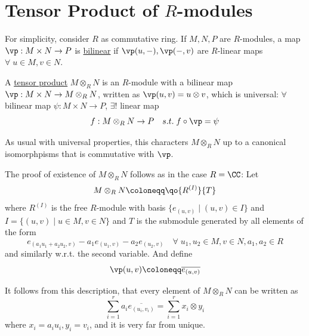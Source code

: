 \section{Tensor Product of \( R \)-modules}
For simplicity, consider \( R \) as commutative ring. If \( M,N,P \) are \( R \)-modules, a map \(
\vp: M\times N \to P \) is \underline{bilinear} if \( \vp(u,-), \vp(-,v) \) are \( R \)-linear maps
\( \forall \; u \in M, v\in N \).

\begin{definition}
	A \underline{tensor product} \( M \otimes_R N \) is an \( R \)-module with a bilinear map \( \vp:
	M \times N \to M \otimes_R N\), written as \( \vp(u,v) = u\otimes v \), which is universal: \(
	\forall  \) bilinear map \( \psi : M\times N \to P \), \( \exists ! \) linear map
	\[
		f: M \otimes_R N \to P \quad s.t. \; f\circ \vp = \psi
	\]
\end{definition}

\begin{remark}
	As usual with universal properties, this characters \( M \otimes_R N \) up to a canonical
	isomorphpisms that is commutative with \( \vp \).
\end{remark}

\begin{remark}
	The proof of existence of \( M \otimes_R N \) follows as in the case \( R = \CC \): Let
	\[
		M \otimes_R N \coloneqq  \qo{R^{(I)}}{T}
	\]
	where \( R^{(I)} \) is the free \( R \)-module with basis \( \{e_{(u,v)} \; | \; (u,v) \in I\} \)
	and \( I = \{(u,v) \; | \; u\in M, v\in N\} \) and \( T \) is the submodule generated by all
	elements of the form
	\[
		e_{(a_1u_1+a_2u_2,v)} - a_1 e_{(u_1,v)} - a_2e_{(u_2,v)} \quad \forall \; u_1,u_2\in M, v\in N,
		a_1,a_2 \in R
	\]
	and similarly w.r.t. the second variable. And define
	\[
		\vp(u,v) \coloneqq  \overline{e_{(u,v)}}
	\]
\end{remark}

\begin{remark}
	It follows from this description, that every element of \( M \otimes_R N \) can be written as
	\[
		\sum_{i=1}^r a_i \overline{e_{(u_i,v_i)}} = \sum_{i=1}^r x_i \otimes y_i
	\]
	where \( x_i = a_i u_i, y_i = v_i \), and it is very far from unique.
\end{remark}


